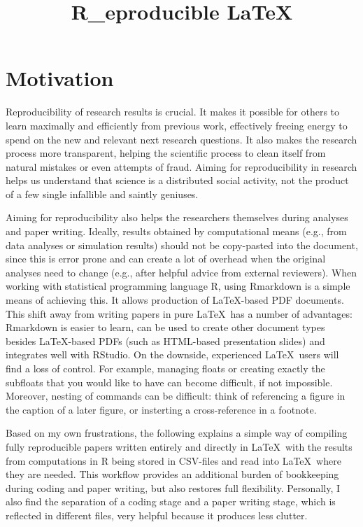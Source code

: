 \documentclass[fleqn,reqno,10pt]{article}
\title{R\_eproducible \LaTeX}
\author{}
\date{}
\begin{document}
\maketitle

\section*{Motivation}

Reproducibility of research results is crucial. It makes it possible for others to learn
maximally and efficiently from previous work, effectively freeing energy to spend on the new and
relevant next research questions. It also makes the research process more transparent, helping
the scientific process to clean itself from natural mistakes or even attempts of fraud. Aiming
for reproducibility in research helps us understand that science is a distributed social
activity, not the product of a few single infallible and saintly geniuses.

Aiming for reproducibility also helps the researchers themselves during analyses and paper
writing. Ideally, results obtained by computational means (e.g., from data analyses or
simulation results) should not be copy-pasted into the document, since this is error prone and
can create a lot of overhead when the original analyses need to change (e.g., after helpful
advice from external reviewers). When working with statistical programming language R, using
Rmarkdown is a simple means of achieving this. It allows production of \LaTeX-based PDF
documents. This shift away from writing papers in pure \LaTeX\ has a number of advantages:
Rmarkdown is easier to learn, can be used to create other document types besides \LaTeX-based
PDFs (such as HTML-based presentation slides) and integrates well with RStudio. On the
downside, experienced \LaTeX\ users will find a loss of control. For example, managing floats
or creating exactly the subfloats that you would like to have can become difficult, if not
impossible. Moreover, nesting of commands can be difficult: think of referencing a figure in
the caption of a later figure, or insterting a cross-reference in a footnote.

Based on my own frustrations, the following explains a simple way of compiling fully reproducible
papers written entirely and directly in \LaTeX\ with the results from computations in R being
stored in CSV-files and read into \LaTeX\ where they are needed. This workflow provides an
additional burden of bookkeeping during coding and paper writing, but also restores full
flexibility. Personally, I also find the separation of a coding stage and a paper writing
stage, which is reflected in different files, very helpful because it produces less clutter.
\end{document}
